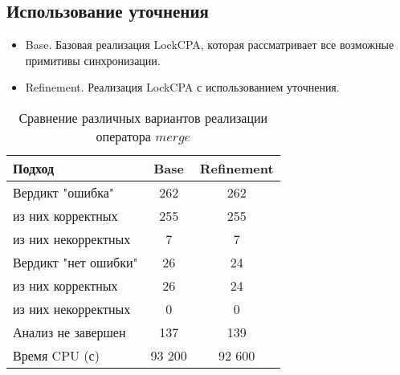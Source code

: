 

\subsection{Использование уточнения}

\begin{itemize}
\item Base. Базовая реализация LockCPA, которая рассматривает все возможные примитивы синхронизации.
\item Refinement. Реализация LockCPA с использованием уточнения.
\end{itemize}

\begin{center}
  \begin{table}[h]\footnotesize \centering
  	\label{table-drivers-lock-refinement}
    \caption{Сравнение различных вариантов реализации оператора $merge$}
    \begin{tabular}{ | l | c | c | }
      \hline 
      Подход         				& Base   	& Refinement \\ \hline
      Вердикт "ошибка" 				& 262    	& 262       \\ 
  \hspace{0.5cm} из них корректных 	& 255 		& 255 		\\ 
  \hspace{0.5cm} из них некорректных & 7 		& 7 		\\ \hline
      Вердикт "нет ошибки"  		& 26      	& 24       	\\ 
  \hspace{0.5cm} из них корректных 	& 26 		& 24    	\\
  \hspace{0.5cm} из них некорректных & 0 		& 0    		\\ \hline
      Анализ не завершен       		& 137     	& 139        \\ \hline
      Время CPU (с)   				& 93 200 	& 92 600    \\ 
      \hline
    \end{tabular}
  \end{table}
\end{center}


